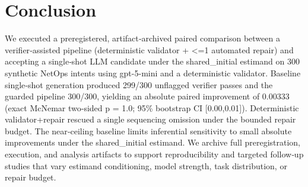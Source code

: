 \documentclass[conference]{IEEEtran}
\begin{document}
\section{Conclusion}
We executed a preregistered, artifact‑archived paired comparison between a verifier‑assisted pipeline (deterministic validator + <=1 automated repair) and accepting a single‑shot LLM candidate under the shared\_initial estimand on 300 synthetic NetOps intents using gpt-5-mini and a deterministic validator. Baseline single‑shot generation produced 299/300 unflagged verifier passes and the guarded pipeline 300/300, yielding an absolute paired improvement of 0.00333 (exact McNemar two‑sided p = 1.0; 95\% bootstrap CI [0.00,0.01]). Deterministic validator+repair rescued a single sequencing omission under the bounded repair budget. The near‑ceiling baseline limits inferential sensitivity to small absolute improvements under the shared\_initial estimand. We archive full preregistration, execution, and analysis artifacts to support reproducibility and targeted follow‑up studies that vary estimand conditioning, model strength, task distribution, or repair budget.
\end{document}
